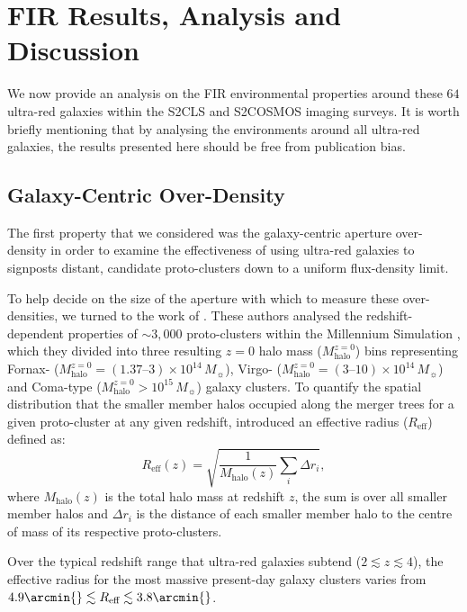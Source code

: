 \documentclass[a4paper, fleqn, usenatbib]{mnras}
\newcommand{\mhalo}{M_{\text{halo}}}
\newcommand{\msol}{M_{\sun}}
\newcommand{\reff}{R_{\text{eff}}}
\newcommand{\urgs}{ultra-red galaxies}
\begin{document}
\section{FIR Results, Analysis and Discussion}
\label{sec:fir_results}

We now provide an analysis on the FIR environmental properties around these $64$ \urgs{} within the S2CLS and S2COSMOS imaging surveys.
It is worth briefly mentioning that by analysing the environments around all \urgs{}, the results presented here should be free from publication bias.

\subsection{Galaxy-Centric Over-Density}

The first property that we considered was the galaxy-centric aperture over-density in order to examine the effectiveness of using \urgs{} to signposts distant, candidate proto-clusters down to a uniform flux-density limit.

To help decide on the size of the aperture with which to measure these over-densities, we turned to the work of \citet{chiang13}.
These authors analysed the redshift-dependent properties of $\sim3{,}000$ proto-clusters within the Millennium Simulation \citep{springel05}, which they divided into three resulting $z=0$ halo mass ($\mhalo^{z=0}$) bins representing Fornax- ($\mhalo^{z=0}=(1.37\text{--}3)\times10^{14}\,\msol{}$), Virgo- ($\mhalo^{z=0}=(3\text{--}10)\times10^{14}\,\msol{}$) and Coma-type ($\mhalo^{z=0}>10^{15}\,\msol{}$) galaxy clusters.
To quantify the spatial distribution that the smaller member halos occupied along the merger trees for a given proto-cluster at any given redshift, \citeauthor{chiang13} introduced an effective radius ($\reff{}$) defined as:
\begin{equation}
    \label{eq:effective_radius}
    \reff{}(z)=\sqrt{\frac{1}{\mhalo{}(z)}\sum_i\Delta r_{i}},
\end{equation}
\noindent
where $\mhalo{}(z)$ is the total halo mass at redshift $z$, the sum is over all smaller member halos and $\Delta r_{i}$ is the distance of each smaller member halo to the centre of mass of its respective proto-clusters.

Over the typical redshift range that \urgs{} subtend ($2\lesssim z \lesssim4$), the effective radius for the most massive present-day galaxy clusters varies from $4.9\arcmin{}\lesssim\reff{}\lesssim3.8\arcmin{}$.
\end{document}

